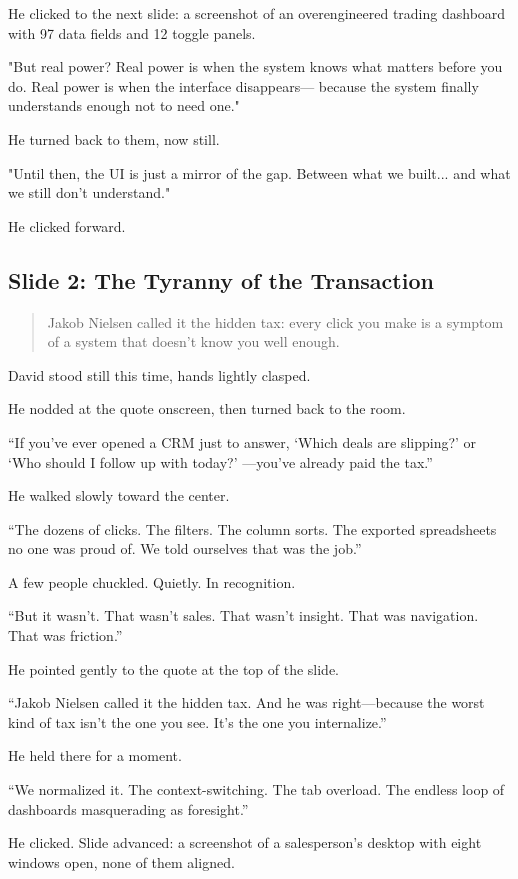 He clicked to the next slide: a screenshot of an overengineered trading dashboard with 97 data fields and 12 toggle panels.

"But real power?
Real power is when the system knows what matters before you do.
Real power is when the interface disappears—
because the system finally understands enough not to need one."

He turned back to them, now still.

"Until then, the UI is just a mirror of the gap.
Between what we built...
and what we still don’t understand."

He clicked forward.

\subsection{Slide 2: The Tyranny of the Transaction}

\begin{quote}
Jakob Nielsen called it the hidden tax: every click you make is a symptom of a system that 
doesn't know you well enough.
\end{quote}

David stood still this time, hands lightly clasped.

He nodded at the quote onscreen, then turned back to the room.

“If you’ve ever opened a CRM just to answer,
‘Which deals are slipping?’
or ‘Who should I follow up with today?’
—you’ve already paid the tax.”

He walked slowly toward the center.

“The dozens of clicks.
The filters.
The column sorts.
The exported spreadsheets no one was proud of.
We told ourselves that was the job.”

A few people chuckled. Quietly. In recognition.

“But it wasn’t.
That wasn’t sales. That wasn’t insight.
That was navigation.
That was friction.”

He pointed gently to the quote at the top of the slide.

“Jakob Nielsen called it the hidden tax.
And he was right—because the worst kind of tax isn’t the one you see.
It’s the one you internalize.”

He held there for a moment.

“We normalized it.
The context-switching.
The tab overload.
The endless loop of dashboards masquerading as foresight.”

He clicked. Slide advanced: a screenshot of a salesperson’s desktop with eight windows open, none of them aligned.

